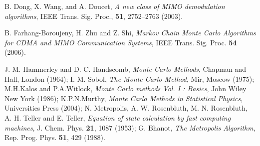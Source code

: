 \documentclass[pre,12pt,aps]{revtex4}
\begin{document}
\begin{thebibliography}{100}
B. Dong, X. Wang, and A. Doucet, 
{\it A new class of MIMO demodulation algorithms}, IEEE 
         Trans. Sig.  Proc., {\bf 51}, 2752–2763 (2003).

B. Farhang-Boroujeny, H. Zhu and Z. Shi, 
{\it Markov Chain Monte Carlo Algorithms for CDMA
          and MIMO Communication Systems}, 
IEEE Trans. Sig. Proc. {\bf 54} (2006).

J. M. Hammerley and D. C. Handscomb, {\it Monte Carlo
Methods}, Chapman and Hall, London (1964);
I. M. Sobol, {\it The Monte Carlo Method}, Mir, Moscow (1975);
M.H.Kalos and P.A.Witlock, {\it Monte Carlo methods Vol. I : Basics},
John Wiley New York (1986);
K.P.N.Murthy, {\it Monte Carlo Methods in Statistical Physics},
Universities Press (2004); 
N. Metropolis, A. W. Rosenbluth, M. N. Rosenbluth, A. H. Teller and 
E. Teller, {\it Equation of state calculation by fast computing
machines}, J. Chem. Phys. {\bf 21}, 1087 (1953);
G. Bhanot, {\it The Metropolis Algorithm}, Rep. Prog. Phys.
{\bf 51}, 429 (1988).
\end{thebibliography}
\end{document}
